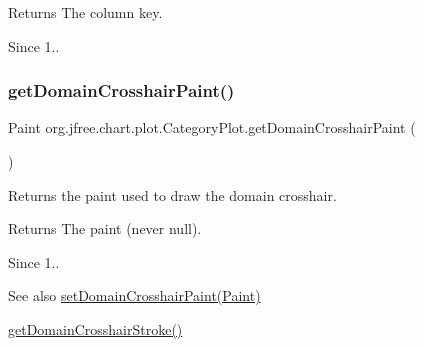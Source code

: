 \begin{DoxyReturn}{Returns}
The column key.
\end{DoxyReturn}
\begin{DoxySince}{Since}
1.. 
\end{DoxySince}
\mbox{\label{classorg_1_1jfree_1_1chart_1_1plot_1_1_category_plot_af251f4c3084a499f54915e07d09ba19c}} 
\subsubsection{\texorpdfstring{get\+Domain\+Crosshair\+Paint()}{getDomainCrosshairPaint()}}
{\footnotesize\ttfamily Paint org.\+jfree.\+chart.\+plot.\+Category\+Plot.\+get\+Domain\+Crosshair\+Paint (\begin{DoxyParamCaption}{ }\end{DoxyParamCaption})}

Returns the paint used to draw the domain crosshair.

\begin{DoxyReturn}{Returns}
The paint (never {\ttfamily null}).
\end{DoxyReturn}
\begin{DoxySince}{Since}
1..
\end{DoxySince}
\begin{DoxySeeAlso}{See also}
\mbox{\hyperlink{classorg_1_1jfree_1_1chart_1_1plot_1_1_category_plot_a96d14ca4936954bccd9059823375c079}{set\+Domain\+Crosshair\+Paint(\+Paint)}} 

\mbox{\hyperlink{classorg_1_1jfree_1_1chart_1_1plot_1_1_category_plot_a87294a333f0a33da9ea7785774a7920f}{get\+Domain\+Crosshair\+Stroke()}} 
\end{DoxySeeAlso}
\mbox{\label{classorg_1_1jfree_1_1chart_1_1plot_1_1_category_plot_a653b0c41af90cc1c634ae786e28d0a62}} 
